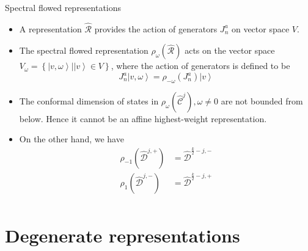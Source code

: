 \documentclass{beamer}
\begin{document}
\begin{frame}{Spectral flowed representations}
  \begin{itemize}
    \item A representation $\widehat{\mathcal{R}} $ provides the action of generators $J^{a}_{n}$ on vector space $V$. 
    \item The spectral flowed representation $\rho_{\omega}\left(\hat{\mathcal{R}}\right)$ acts on the 
          vector space $V_{\omega} = \left\{ \left|v, \omega \right\rangle \Big| \left|v \right\rangle \in V \right\}$, 
          where the action of generators is defined to be 
          \begin{equation}
            J^{a}_{n} \left|v, \omega \right\rangle = \rho_{-\omega}\left(J^{a}_{n}\right) \left|v \right\rangle
          \end{equation}
    \item The conformal dimension of states in $\rho_{\omega} \left(\hat{\mathcal{C}}^{j}\right), \omega \neq 0$ are not bounded 
      from below. Hence it cannot be an affine highest-weight representation.
    \item On the other hand, we have 
      \begin{equation}
        \begin{aligned}
            \rho_{-1}\left( \widehat{\mathcal{D}}^{j,+} \right) &= \widehat{\mathcal{D}}^{\frac{k}{2}-j,-}\\
            \rho_{1}\left( \widehat{\mathcal{D}}^{j,-} \right) &= \widehat{\mathcal{D}}^{\frac{k}{2}-j,+}\\
        \end{aligned}
      \end{equation}
  \end{itemize}
\end{frame}

\section{Degenerate representations}
\end{document}
